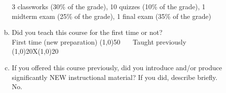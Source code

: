 \begin{enumerate}
\begin{enumerate}[a)]
      3 classworks (30\% of the grade), 10 quizzes (10\% of the grade), 1 midterm exam (25\% of the grade), 1 final exam (35\% of the grade) 	 
    \item Did you teach this course for the first time or not? \\
      First time (new preparation) \line(1,0){50}  ~~~Taught previously \line(1,0){20}X\line(1,0){20}
    \item If you offered this course previously, did you introduce and/or produce significantly NEW instructional material? If you did, describe briefly. \\
      No.
    \end{enumerate}
\end{enumerate}

